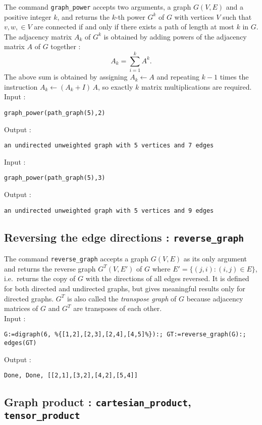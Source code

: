 \documentclass[a4paper,11pt]{article}
\begin{document}
The command {\tt graph\_power} accepts two arguments, a graph $ G(V,E) $ and a positive integer $ k $, and returns the $ k $-th power $ G^k $ of $ G $ with vertices $ V $ such that $ v,w,\in V $ are connected if and only if there exists a path of length at most $ k $ in $ G $. The adjacency matrix $ A_k $ of $ G^k $ is obtained by adding powers of the adjacency matrix $ A $ of $ G $ together :
\[ A_k=\sum_{i=1}^k A^k. \]
The above sum is obtained by assigning $ A_k\leftarrow A $ and repeating $ k-1 $ times the instruction $ A_k\leftarrow (A_k+I)\,A $, so exactly $ k $ matrix multiplications are required.\\
Input :
\begin{center}
  \tt graph\_power(path\_graph(5),2)
\end{center}
Output :
\begin{center}
  \tt an undirected unweighted graph with 5 vertices and 7 edges
\end{center}
Input :
\begin{center}
  \tt graph\_power(path\_graph(5),3)
\end{center}
Output :
\begin{center}
  \tt an undirected unweighted graph with 5 vertices and 9 edges
\end{center}

\subsection{Reversing the edge directions : {\tt reverse\_graph}}

The command {\tt reverse\_graph} accepts a graph $ G(V,E) $ as its only argument and returns the reverse graph $ G^T(V,E') $ of $ G $ where $ E'=\{(j,i):(i,j)\in E\} $, i.e.~returns the copy of $ G $ with the directions of all edges reversed. It is defined for both directed and undirected graphs, but gives meaningful results only for directed graphs. $ G^T $ is also called the \emph{transpose graph} of $ G $ because adjacency matrices of $ G $ and $ G^T $ are transposes of each other.\\
Input :
\begin{center}
  \tt G:=digraph(6, \%\{[1,2],[2,3],[2,4],[4,5]\%\}):; GT:=reverse\_graph(G):; edges(GT)
\end{center}
Output :
\begin{center}
  \tt Done, Done, [[2,1],[3,2],[4,2],[5,4]]
\end{center}

\subsection{Graph product : {\tt cartesian\_product}, {\tt tensor\_product}}
\end{document}
